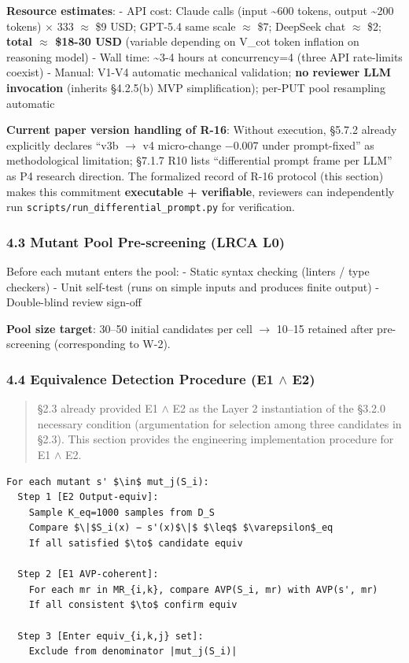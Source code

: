\documentclass[review,12pt,authoryear]{elsarticle}
\begin{document}
\textbf{Resource estimates}: - API cost: Claude calls (input
\textasciitilde600 tokens, output \textasciitilde200 tokens) $\times$ 333 $\approx$ \$9
USD; GPT-5.4 same scale $\approx$ \$7; DeepSeek chat $\approx$ \$2; \textbf{total $\approx$
\$18-30 USD} (variable depending on V\_cot token inflation on reasoning
model) - Wall time: \textasciitilde3-4 hours at concurrency=4 (three API
rate-limits coexist) - Manual: V1-V4 automatic mechanical validation;
\textbf{no reviewer LLM invocation} (inherits §4.2.5(b) MVP
simplification); per-PUT pool resampling automatic

\textbf{Current paper version handling of R-16}: Without execution,
§5.7.2 already explicitly declares ``v3b $\to$ v4 micro-change −0.007 under
prompt-fixed'' as methodological limitation; §7.1.7 R10 lists
``differential prompt frame per LLM'' as P4 research direction. The
formalized record of R-16 protocol (this section) makes this commitment
\textbf{executable + verifiable}, reviewers can independently run
\texttt{scripts/run\_differential\_prompt.py} for verification.

\subsubsection{4.3 Mutant Pool Pre-screening (LRCA
L0)}\label{mutant-pool-pre-screening-lrca-l0}

Before each mutant enters the pool: - Static syntax checking (linters /
type checkers) - Unit self-test (runs on simple inputs and produces
finite output) - Double-blind review sign-off

\textbf{Pool size target}: 30--50 initial candidates per cell $\to$ 10--15
retained after pre-screening (corresponding to W-2).

\subsubsection{4.4 Equivalence Detection Procedure (E1 $\wedge$
E2)}\label{equivalence-detection-procedure-e1-e2}

\begin{quote}
§2.3 already provided E1 $\wedge$ E2 as the Layer 2 instantiation of the §3.2.0
necessary condition (argumentation for selection among three candidates
in §2.3). This section provides the engineering implementation procedure
for E1 $\wedge$ E2.
\end{quote}

\begin{verbatim}
For each mutant s' $\in$ mut_j(S_i):
  Step 1 [E2 Output-equiv]:
    Sample K_eq=1000 samples from D_S
    Compare $\|$S_i(x) − s'(x)$\|$ $\leq$ $\varepsilon$_eq
    If all satisfied $\to$ candidate equiv

  Step 2 [E1 AVP-coherent]:
    For each mr in MR_{i,k}, compare AVP(S_i, mr) with AVP(s', mr)
    If all consistent $\to$ confirm equiv

  Step 3 [Enter equiv_{i,k,j} set]:
    Exclude from denominator |mut_j(S_i)|
\end{verbatim}
\end{document}
